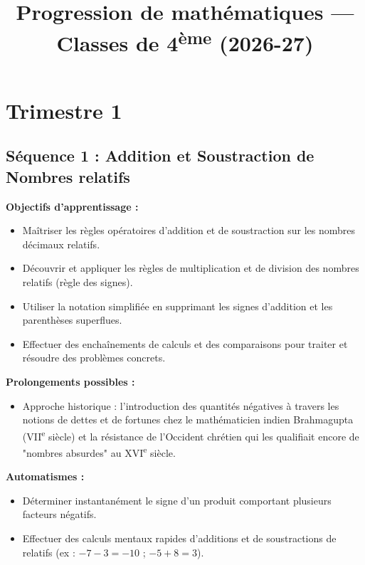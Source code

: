 \documentclass[11pt,a4paper]{article}
\title{\textbf{\Large Progression de mathématiques --- Classes de 4\textsuperscript{ème} (2026-27)}}
\author{}
\date{}
\begin{document}
\maketitle
\vspace{-3em}

\section{Trimestre 1}

\subsection{Séquence 1 : Addition et Soustraction de Nombres relatifs}
\textbf{Objectifs d’apprentissage :}
\begin{itemize}
    \item Maîtriser les règles opératoires d’addition et de soustraction sur les nombres décimaux relatifs.
    \item Découvrir et appliquer les règles de multiplication et de division des nombres relatifs (règle des signes).
    \item Utiliser la notation simplifiée en supprimant les signes d’addition et les parenthèses superflues.
    \item Effectuer des enchaînements de calculs et des comparaisons pour traiter et résoudre des problèmes concrets.
\end{itemize}

\textbf{Prolongements possibles :}
\begin{itemize}
    \item Approche historique : l'introduction des quantités négatives à travers les notions de dettes et de fortunes chez le mathématicien indien Brahmagupta (VII\textsuperscript{e} siècle) et la résistance de l'Occident chrétien qui les qualifiait encore de "nombres absurdes" au XVI\textsuperscript{e} siècle.
\end{itemize}

\textbf{Automatismes :}
\begin{itemize}
    \item Déterminer instantanément le signe d'un produit comportant plusieurs facteurs négatifs.
    \item Effectuer des calculs mentaux rapides d'additions et de soustractions de relatifs (ex : $-7 - 3 = -10$ ; $-5 + 8 = 3$).
\end{itemize}
\end{document}
